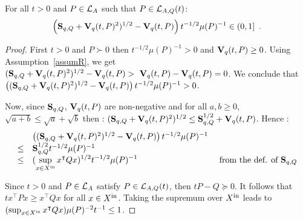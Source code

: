 \documentclass[10pt]{article}
\begin{document}
\begin{comment}
\begin{lemma}
For all $P$ satisfying Hypothesis~\eqref{hypo1}, $0\leq \alpha(Q,\xin) \alpha(P,\xin)^{-1}\lambda_1(Q)^{-1}\leq 1$. 
For all $P$ satisfying Hypothesis~\eqref{hypo2}, $0\leq \alpha(Q,\xin) \alpha(P,\xin)^{-1}\lambda_{d}(P)\lambda_1(Q)^{-1}\leq 1$.    
\end{lemma}
\end{comment}

\begin{lemma}
For all $t>0$ and $P\in\mathcal{L}_{A}$ such that $P\in\mathcal{L}_{A,Q}(t)$: \[
\left(\mathbf{S}_{q,Q}+\mathbf{V}_{q}(t,P)^2)^{1/2}-\mathbf{V}_{q}(t,P)\right) t^{-1/2}\mu(P)^{-1}\in (0,1]\enspace .
\]
\end{lemma}

\begin{proof}
First $t>0$ and $P\succ 0$ then $t^{-1/2}\mu(P)^{-1}>0$ and $\mathbf{V}_{q}(t,P)\geq 0$. Using Assumption~\ref{assumR}, we get $(\lfrak+\vqQ(t,P)^2)^{1/2}-\vqQ(t,P)> \vqQ(t,P)-\vqQ(t,P)=0$. We conclude that $\left((\mathbf{S}_{q,Q}+\mathbf{V}_{q}(t,P)^2)^{1/2}-\mathbf{V}_{q}(t,P)\right) t^{-1/2}\mu(P)^{-1}>0$. 

Now, since $\mathbf{S}_{q,Q}$, $\mathbf{V}_{q}(t,P)$ are non-negative and for all $a,b\geq 0$, $\sqrt{a+b}\leq \sqrt{a}+\sqrt{b}$  then : 
$(\mathbf{S}_{q,Q}+\mathbf{V}_{q}(t,P)^2)^{1/2}\leq \mathbf{S}_{q,Q}^{1/2}+\mathbf{V}_{q}(t,P)$. Hence : 
\[
\begin{array}{lll}
&\left((\mathbf{S}_{q,Q}+\mathbf{V}_{q}(t,P)^2)^{1/2}-\mathbf{V}_{q}(t,P)\right) t^{-1/2}\mu(P)^{-1}& \\
\leq &\mathbf{S}_{q,Q}^{1/2} t^{-1/2}\mu(P)^{-1} & \\
\leq &(\displaystyle{\sup_{x\in X^\mathrm{in}} x^\intercal Q x})^{1/2} t^{-1/2}\mu(P)^{-1} & \text{ from the def. of } \mathbf{S}_{q,Q}
\end{array}
\]

Since $t>0$ and $P\in\mathcal{L}_{A}$ satisfy $P\in\mathcal{L}_{A,Q}(t)$, then $t P-Q\succeq 0$. It follows that 
$t x^\intercal P x\geq x^\intercal Q x$ for all $x\in X^\mathrm{in}$. Taking the supremum over $X^\mathrm{in}$ leads to $(\sup_{x\in X^\mathrm{in}} x^\intercal Q x)\mu(P)^{-2}t^{-1} \leq 1$. 
\begin{comment}
Note that  $\alpha(Q,\xin) \alpha(P,\xin)^{-1}\lambda_1(Q)^{-1}$ is nonnegative since $P$ and $Q$ are positive semi-definite and thus each factor of the latter product is nonnegative.

Applying twice Lemma~\ref{lemma1}, we get $Q\preceq \lambda_1(Q) Id\preceq \lambda_1(Q)\lambda_d(P)^{-1} P$. Now taking $x\in\xin$,
we conclude that $\alpha(Q,\xin) \alpha(P,\xin)^{-1}\lambda_{d}(P)\lambda_1(Q)^{-1}\leq 1$. The fact that the latter product is nonnegative follows readily from the fact that $P$ and $Q$ are positive semidefinite.
\end{comment}
\end{proof}
\end{document}

